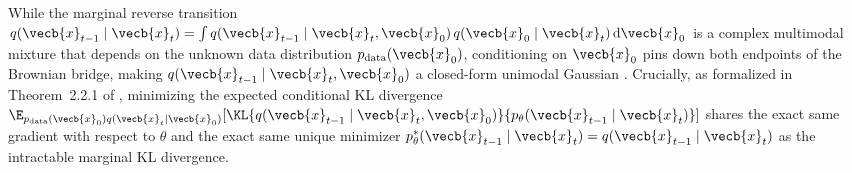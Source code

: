 \documentclass[../../../../master.tex]{subfiles}
\begin{document}
\begin{intuition}
While the marginal reverse transition $q(\vecb{x}_{t-1} \mid \vecb{x}_t) = \int q(\vecb{x}_{t-1} \mid \vecb{x}_t, \vecb{x}_0)\,q(\vecb{x}_0 \mid \vecb{x}_t)\,\mathrm{d}\vecb{x}_0$ is a complex multimodal mixture that depends on the unknown data distribution $p_{\mathrm{data}}(\vecb{x}_0)$, conditioning on $\vecb{x}_0$ pins down both endpoints of the Brownian bridge, making $q(\vecb{x}_{t-1} \mid \vecb{x}_t, \vecb{x}_0)$ a closed-form unimodal Gaussian . Crucially, as formalized in Theorem~2.2.1 of , minimizing the expected conditional KL divergence $\E_{p_{\mathrm{data}}(\vecb{x}_0)q(\vecb{x}_t \mid \vecb{x}_0)}[\KL{q(\vecb{x}_{t-1}\mid\vecb{x}_t,\vecb{x}_0)}{p_\theta(\vecb{x}_{t-1}\mid\vecb{x}_t)}]$ shares the exact same gradient with respect to $\theta$ and the exact same unique minimizer $p_\theta^*(\vecb{x}_{t-1} \mid \vecb{x}_t) = q(\vecb{x}_{t-1} \mid \vecb{x}_t)$ as the intractable marginal KL divergence.
\end{intuition}
\end{document}
